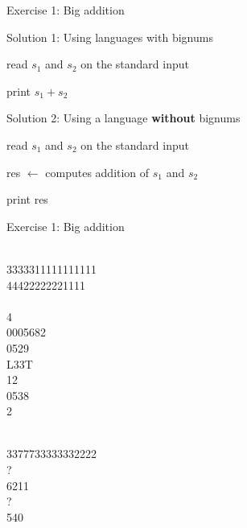 \documentclass{beamer}
\begin{document}
\begin{frame}[fragile]{Exercise 1: Big addition}
  \begin{code}{Solution 1: Using languages with bignums}
    \begin{PseudoCode}
read $s_1$ and $s_2$ on the standard input

print $s_1 + s_2$
    \end{PseudoCode}
  \end{code}

  \begin{code}{Solution 2: Using a language \textbf{without} bignums}
    \begin{PseudoCode}
read $s_1$ and $s_2$ on the standard input

res $\leftarrow$ computes addition of $s_1$ and $s_2$

print res
    \end{PseudoCode}
  \end{code}
\end{frame}

\begin{frame}[fragile]{Exercise 1: Big addition}
  \begin{example}
    \begin{minipage}[t]{0.45\textwidth}
    \\
    3333311111111111\\
    44422222221111\\
    \\
    4\\
    0005682\\
    0529\\
    L33T\\
    12\\
    0538\\
    2
    \end{minipage}\hfill
    \begin{minipage}[t]{0.45\textwidth}
    \\
    3377733333332222\\
    ?\\
    6211\\
    ?\\
    540
    \end{minipage}
  \end{example}
\end{frame}
\end{document}
